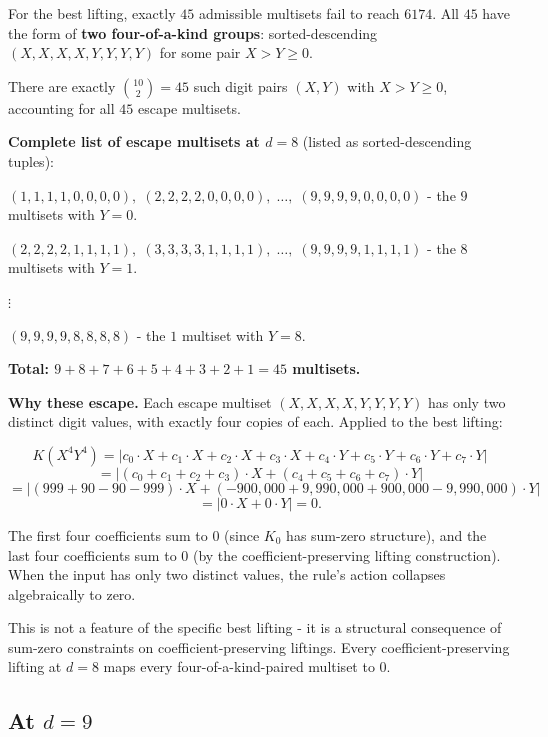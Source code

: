 \documentclass[11pt,letterpaper]{article}
\theoremstyle{paperstyle}
\theoremstyle{paperstyledef}
\theoremstyle{paperstylerem}
\begin{document}
For the best lifting, exactly \(45\) admissible multisets fail to reach
\(6174\). All \(45\) have the form of \textbf{two four-of-a-kind
groups}: sorted-descending \((X, X, X, X, Y, Y, Y, Y)\) for some pair
\(X > Y \geq 0\).

There are exactly \(\binom{10}{2} = 45\) such digit pairs \((X, Y)\)
with \(X > Y \geq 0\), accounting for all \(45\) escape multisets.

\textbf{Complete list of escape multisets at \(d = 8\)} (listed as
sorted-descending tuples):

\((1, 1, 1, 1, 0, 0, 0, 0), \; (2, 2, 2, 2, 0, 0, 0, 0), \; \ldots, \; (9, 9, 9, 9, 0, 0, 0, 0)\) - the \(9\) multisets with \(Y = 0\).

\((2, 2, 2, 2, 1, 1, 1, 1), \; (3, 3, 3, 3, 1, 1, 1, 1), \; \ldots, \; (9, 9, 9, 9, 1, 1, 1, 1)\) - the \(8\) multisets with \(Y = 1\).

\(\vdots\)

\((9, 9, 9, 9, 8, 8, 8, 8)\) - the \(1\) multiset with \(Y = 8\).

\textbf{Total: \(9 + 8 + 7 + 6 + 5 + 4 + 3 + 2 + 1 = 45\) multisets.}

\textbf{Why these escape.} Each escape multiset
\((X, X, X, X, Y, Y, Y, Y)\) has only two distinct digit values, with
exactly four copies of each. Applied to the best lifting:

\[K(X^4 Y^4) = |c_0 \cdot X + c_1 \cdot X + c_2 \cdot X + c_3 \cdot X + c_4 \cdot Y + c_5 \cdot Y + c_6 \cdot Y + c_7 \cdot Y|\]
\[= |(c_0 + c_1 + c_2 + c_3) \cdot X + (c_4 + c_5 + c_6 + c_7) \cdot Y|\]
\[= |(999 + 90 - 90 - 999) \cdot X + (-900{,}000 + 9{,}990{,}000 + 900{,}000 - 9{,}990{,}000) \cdot Y|\]
\[= |0 \cdot X + 0 \cdot Y| = 0.\]

The first four coefficients sum to \(0\) (since \(K_0\) has sum-zero
structure), and the last four coefficients sum to \(0\) (by the
coefficient-preserving lifting construction). When the input has only
two distinct values, the rule's action collapses algebraically to zero.

This is not a feature of the specific best lifting - it is a
structural consequence of sum-zero constraints on coefficient-preserving
liftings. Every coefficient-preserving lifting at \(d = 8\) maps every
four-of-a-kind-paired multiset to \(0\).

\hypertarget{e.2.3-at-d-9}{%
\subsection{\texorpdfstring{At \(d = 9\)}{At d = 9}}\label{e.2.3-at-d-9}}
\end{document}
